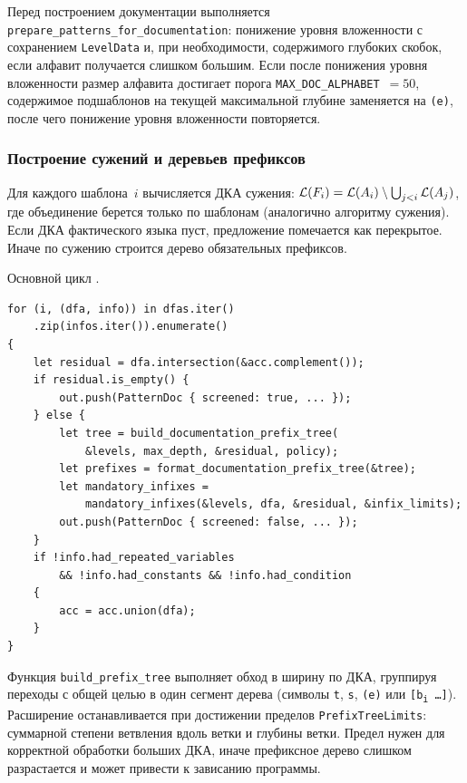 Перед построением документации выполняется \texttt{prepare\_patterns\_for\_documentation}: понижение уровня вложенности с сохранением \texttt{LevelData} и, при необходимости,  содержимого глубоких скобок, если алфавит получается слишком большим.
Если после понижения уровня вложенности размер алфавита достигает порога \texttt{MAX\_DOC\_ALPHABET}~$= 50$, содержимое подшаблонов на текущей максимальной глубине заменяется на \texttt{(e)}, после чего понижение уровня вложенности повторяется.

\subsubsection{Построение сужений и деревьев префиксов}

Для каждого шаблона~$i$ вычисляется ДКА сужения: $\mathcal{L}(F_i) = \mathcal{L}(A_i) \setminus \bigcup_{j<i} \mathcal{L}(A_j)$, где объединение берется только по  шаблонам (аналогично алгоритму сужения).
Если ДКА фактического языка пуст, предложение помечается как перекрытое.
Иначе по сужению строится дерево обязательных префиксов.

Основной цикл .

\begin{listing}[H]
\caption{Цикл извлечения документации для предложений функции}
\label{lst:docgen-loop}
\begin{verbatim}
for (i, (dfa, info)) in dfas.iter()
    .zip(infos.iter()).enumerate()
{
    let residual = dfa.intersection(&acc.complement());
    if residual.is_empty() {
        out.push(PatternDoc { screened: true, ... });
    } else {
        let tree = build_documentation_prefix_tree(
            &levels, max_depth, &residual, policy);
        let prefixes = format_documentation_prefix_tree(&tree);
        let mandatory_infixes =
            mandatory_infixes(&levels, dfa, &residual, &infix_limits);
        out.push(PatternDoc { screened: false, ... });
    }
    if !info.had_repeated_variables
        && !info.had_constants && !info.had_condition
    {
        acc = acc.union(dfa);
    }
}
\end{verbatim}
\end{listing}

Функция \texttt{build\_prefix\_tree} выполняет обход в ширину по ДКА, группируя переходы с общей целью в один сегмент дерева (символы \texttt{t}, \texttt{s}, \texttt{(e)} или \texttt{[b\textsubscript{i}\,\ldots]}).
Расширение останавливается при достижении пределов \texttt{PrefixTreeLimits}: суммарной степени ветвления вдоль ветки и глубины ветки. Предел нужен для корректной обработки больших ДКА, иначе 
префиксное дерево слишком разрастается и может привести к зависанию программы.

